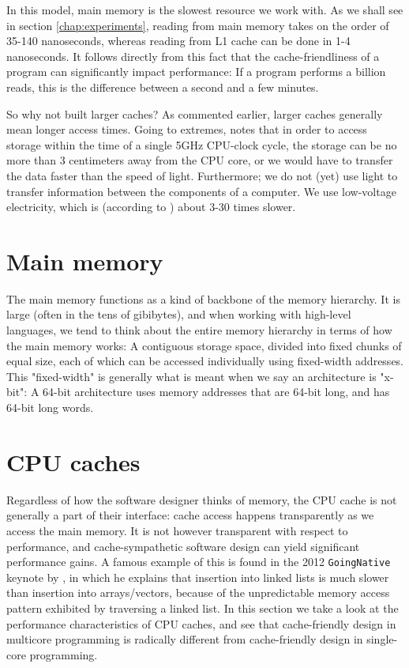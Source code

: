 In this model, main memory is the slowest resource we work with. As we shall see
in section \ref{chap:experiments}, reading from main memory takes on the
order of 35-140 nanoseconds, whereas reading from L1 cache can be done in 1-4
nanoseconds. It follows directly from this fact that the cache-friendliness of a
program can significantly impact performance: If a program performs a billion
reads, this is the difference between a second and a few minutes.

So why not built larger caches? As commented earlier, larger caches generally
mean longer access times. Going to extremes, \citeauthor{mckenney} \cite{mckenney} notes that in order
to access storage within the time of a single 5GHz CPU-clock cycle, the storage
can be no more than 3 centimeters away from the CPU core, or we would have to
transfer the data faster than the speed of light. Furthermore; we do not (yet)
use light to transfer information between the components of a computer. We use
low-voltage electricity, which is (according to \cite{mckenney}) about 3-30
times slower.

\section{Main memory}
The main memory functions as a kind of backbone of the memory hierarchy. It is
large (often in the tens of gibibytes), and when working with high-level
languages, we tend to think about the entire memory
hierarchy in terms of how the main memory works: A contiguous storage space,
divided into fixed chunks of equal size, each of which can be
accessed individually using fixed-width addresses. This "fixed-width" is
generally what is meant when we say an architecture is "x-bit": A 64-bit
architecture uses memory addresses that are 64-bit long, and has 64-bit long
words.

\section{CPU caches}
Regardless of how the software designer thinks of memory, the CPU cache is not
generally a part of their interface: cache access happens transparently as we
access the main memory. It is not however transparent with
respect to performance, and cache-sympathetic software design can yield
significant performance gains. A famous example of this is found in the 2012
\texttt{GoingNative} keynote by \citeauthor{stroustrup} \cite{stroustrup}, in
which he explains that insertion into linked lists is much slower than
insertion into arrays/vectors, because of the unpredictable memory access
pattern exhibited by traversing a linked list. In this section we take a look
at the performance characteristics of CPU caches, and see that cache-friendly
design in multicore programming is radically different from cache-friendly
design in single-core programming. 


